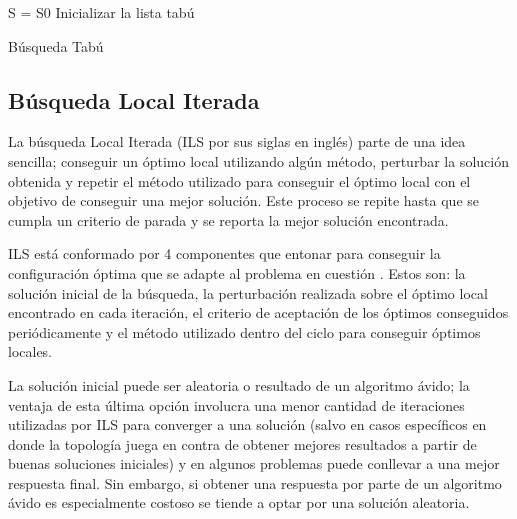 \documentclass{ci5652}
\begin{document}
\begin{algorithm}
 \label{alg3}
 \DontPrintSemicolon
 \vspace*{0.1cm}
 S = S0 
 Inicializar la lista tabú \;
 \vspace*{0.1cm}
 \caption{Búsqueda Tabú}
\end{algorithm}

\subsection{Búsqueda Local Iterada}

La búsqueda Local Iterada (ILS por sus siglas en inglés) parte de una idea sencilla; conseguir un óptimo local utilizando algún método, perturbar la solución obtenida y repetir el método utilizado para conseguir el óptimo local con el objetivo de conseguir una mejor solución. Este proceso se repite hasta que se cumpla un criterio de parada y se reporta la mejor solución encontrada.

ILS está conformado por 4 componentes que entonar para conseguir la configuración óptima que se adapte al problema en cuestión \cite{9}. Estos son: la solución inicial de la búsqueda, la perturbación realizada sobre el óptimo local encontrado en cada iteración, el criterio de aceptación de los óptimos conseguidos periódicamente y el método utilizado dentro del ciclo para conseguir óptimos locales.

La solución inicial puede ser aleatoria o resultado de un algoritmo ávido; la ventaja de esta última opción involucra una menor cantidad de iteraciones utilizadas por ILS para converger a una solución (salvo en casos específicos en donde la topología juega en contra de obtener mejores resultados a partir de buenas soluciones iniciales) y en algunos problemas puede conllevar a una mejor respuesta final. Sin embargo, si obtener una respuesta por parte de un algoritmo ávido es especialmente costoso se tiende a optar por una solución aleatoria.
\end{document}

